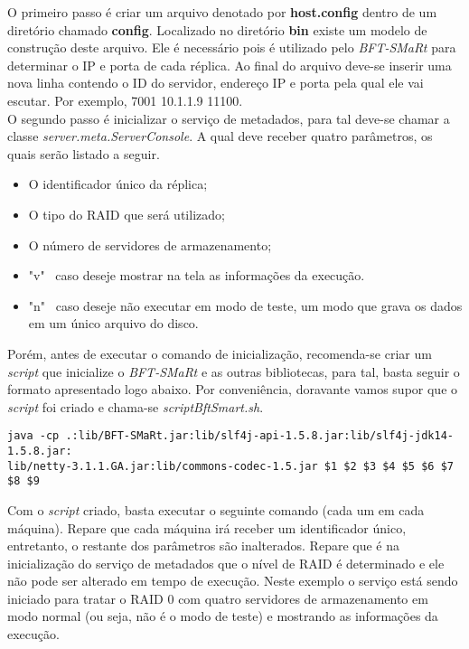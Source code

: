 O primeiro passo é criar um arquivo denotado por \textbf{host.config} dentro de um diretório chamado \textbf{config}. Localizado no diretório \textbf{bin} existe um modelo de construção deste arquivo. Ele é necessário pois é utilizado pelo \textit{BFT-SMaRt} para determinar o IP e porta de cada réplica. Ao final do arquivo deve-se inserir uma nova linha contendo o ID do servidor, endereço IP e porta pela qual ele vai escutar. Por exemplo, 7001 10.1.1.9 11100.
\\

O segundo passo é inicializar o serviço de metadados, para tal deve-se chamar a classe \textit{server.meta.ServerConsole}. A qual deve receber quatro parâmetros, os quais serão listado a seguir. 
\\

\begin{itemize}
	\item O identificador único da réplica;
	\item O tipo do RAID que será utilizado;
	\item O número de servidores de armazenamento;
	\item "v" ~caso deseje mostrar na tela as informações da execução.
	\item "n" ~caso deseje não executar em modo de teste, um modo que grava os dados em um único arquivo do disco.
\end{itemize}

Porém, antes de executar o comando de inicialização, recomenda-se criar um \textit{script} que inicialize o \textit{BFT-SMaRt} e as outras bibliotecas, para tal, basta seguir o formato apresentado logo abaixo. Por conveniência, doravante vamos supor que o \textit{script} foi criado e chama-se \textit{scriptBftSmart.sh}.

\begin{lstlisting}
java -cp .:lib/BFT-SMaRt.jar:lib/slf4j-api-1.5.8.jar:lib/slf4j-jdk14-1.5.8.jar:
lib/netty-3.1.1.GA.jar:lib/commons-codec-1.5.jar $1 $2 $3 $4 $5 $6 $7 $8 $9
\end{lstlisting}

Com o \textit{script} criado, basta executar o seguinte comando (cada um em cada máquina). Repare que cada máquina irá receber um identificador único, entretanto, o restante dos parâmetros são inalterados. Repare que é na inicialização do serviço de metadados que o nível de RAID é determinado e ele não pode ser alterado em tempo de execução. Neste exemplo o serviço está sendo iniciado para tratar o RAID 0 com quatro servidores de armazenamento em modo normal (ou seja, não é o modo de teste) e mostrando as informações da execução.
\\
\\


